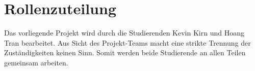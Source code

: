 \chapter{Rollenzuteilung}
\vspace{0.5cm}

Das vorliegende Projekt wird durch die Studierenden Kevin Kirn und Hoang Tran bearbeitet. Aus Sicht des Projekt-Teams macht eine strikte Trennung der Zuständigkeiten keinen Sinn. Somit werden beide Studierende an allen Teilen gemeinsam arbeiten. 